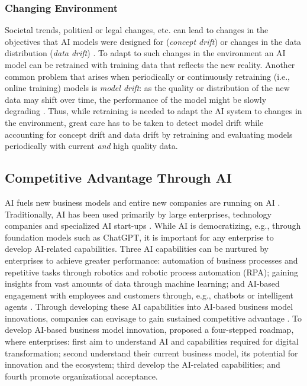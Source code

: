 \subsubsection{Changing Environment}

Societal trends, political or legal changes, etc. can lead to changes in the objectives that AI models were designed for
(\textit{concept drift}) or changes in the data distribution (\textit{data drift}) \citep{luDatadrivenDecisionSupport2020}.
To adapt to such changes in the environment an AI model can be retrained with training data that reflects the new reality.
Another common problem that arises when periodically or continuously retraining (i.e., online training) models is \textit{model drift}:
as the quality or distribution of the new data may shift over time, the performance of the model might be slowly degrading
\citep{nelsonEvaluatingModelDrift2015}. Thus, while retraining is needed to adapt the AI system to changes in the environment,
great care has to be taken to detect model drift while accounting for concept drift and data drift by retraining and evaluating
models periodically with current \textit{and} high quality data.

\subsection{Competitive Advantage Through AI}

AI fuels new business models and entire new companies are running on AI \citep{iansitiCompetingAgeAI2020}. Traditionally, AI has
been used primarily by large enterprises, technology companies and specialized AI start-ups \citep[p. 30-31]{davenportAIAdvantageHow2018a}.
While AI is democratizing, e.g., through foundation models such as ChatGPT, it is important for any enterprise to develop
AI-related capabilities. Three AI capabilities can be nurtured by enterprises to achieve greater performance: automation of
business processes and repetitive tasks through robotics and robotic process automation (RPA); gaining insights from vast amounts
of data through machine learning; and AI-based engagement with employees and customers through, e.g., chatbots or intelligent agents
\citep[p. 41]{davenportAIAdvantageHow2018a}. Through developing these AI capabilities into AI-based business model innovations,
companies can envisage to gain sustained competitive advantage \citep{sjodinHowAICapabilities2021}. To develop AI-based business
model innovation, \cite{reimImplementationArtificialIntelligence2020} proposed a four-stepped roadmap, where enterprises: first
aim to understand AI and capabilities required for digital transformation; second understand their current business model, its
potential for innovation and the ecosystem; third develop the AI-related capabilities; and fourth promote organizational acceptance.

